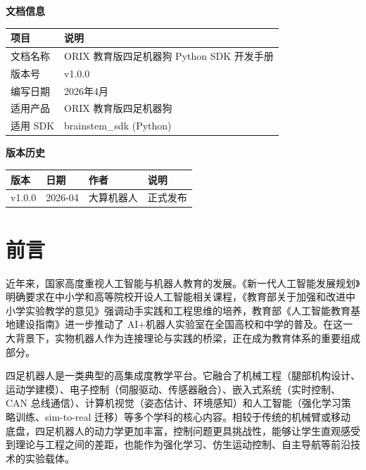 \documentclass[a4paper,11pt,openany]{book}
\begin{document}
\thispagestyle{empty}
\vspace*{\fill}
\noindent\textbf{文档信息}\\[0.5em]
\begin{tabular}{ll}
\toprule
项目 & 说明 \\
\midrule
文档名称 & ORIX 教育版四足机器狗 Python SDK 开发手册 \\
版本号   & v1.0.0 \\
编写日期 & 2026年4月 \\
适用产品 & ORIX 教育版四足机器狗 \\
适用 SDK & brainstem\_sdk (Python) \\
\bottomrule
\end{tabular}

\vspace{2em}
\noindent\textbf{版本历史}\\[0.5em]
\begin{tabular}{llll}
\toprule
版本 & 日期 & 作者 & 说明 \\
\midrule
v1.0.0 & 2026-04 & 大算机器人 & 正式发布 \\
\bottomrule
\end{tabular}

\vspace{2em}
\newpage

\tableofcontents
\newpage

\chapter*{前言}
\thispagestyle{fancy}

近年来，国家高度重视人工智能与机器人教育的发展。《新一代人工智能发展规划》明确要求在中小学和高等院校开设人工智能相关课程，《教育部关于加强和改进中小学实验教学的意见》强调动手实践和工程思维的培养，教育部《人工智能教育基地建设指南》进一步推动了 AI+机器人实验室在全国高校和中学的普及。在这一大背景下，实物机器人作为连接理论与实践的桥梁，正在成为教育体系的重要组成部分。

四足机器人是一类典型的高集成度教学平台。它融合了机械工程（腿部机构设计、运动学建模）、电子控制（伺服驱动、传感器融合）、嵌入式系统（实时控制、CAN 总线通信）、计算机视觉（姿态估计、环境感知）和人工智能（强化学习策略训练、sim-to-real 迁移）等多个学科的核心内容。相较于传统的机械臂或移动底盘，四足机器人的动力学更加丰富，控制问题更具挑战性，能够让学生直观感受到理论与工程之间的差距，也能作为强化学习、仿生运动控制、自主导航等前沿技术的实验载体。
\end{document}
